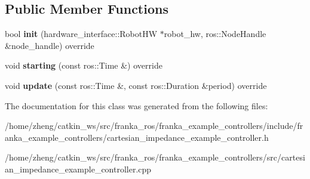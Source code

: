 \subsection*{Public Member Functions}
\begin{DoxyCompactItemize}
\item 
\mbox{\label{classfranka__example__controllers_1_1_cartesian_impedance_example_controller_aa61fee8f409bbfda931c202123dbd7f5}} 
bool {\bfseries init} (hardware\+\_\+interface\+::\+Robot\+HW $\ast$robot\+\_\+hw, ros\+::\+Node\+Handle \&node\+\_\+handle) override
\item 
\mbox{\label{classfranka__example__controllers_1_1_cartesian_impedance_example_controller_a9191e1f9d60551294d1f225af39f7926}} 
void {\bfseries starting} (const ros\+::\+Time \&) override
\item 
\mbox{\label{classfranka__example__controllers_1_1_cartesian_impedance_example_controller_ab7e3690c65dbf1ff57a5d37cb651cd04}} 
void {\bfseries update} (const ros\+::\+Time \&, const ros\+::\+Duration \&period) override
\end{DoxyCompactItemize}


The documentation for this class was generated from the following files\+:\begin{DoxyCompactItemize}
\item 
/home/zheng/catkin\+\_\+ws/src/franka\+\_\+ros/franka\+\_\+example\+\_\+controllers/include/franka\+\_\+example\+\_\+controllers/cartesian\+\_\+impedance\+\_\+example\+\_\+controller.\+h\item 
/home/zheng/catkin\+\_\+ws/src/franka\+\_\+ros/franka\+\_\+example\+\_\+controllers/src/cartesian\+\_\+impedance\+\_\+example\+\_\+controller.\+cpp\end{DoxyCompactItemize}

